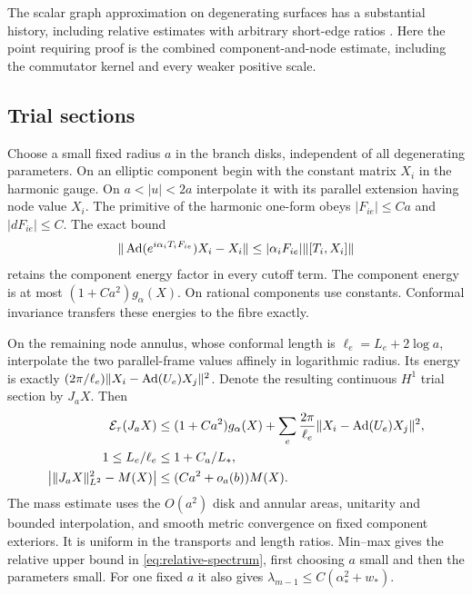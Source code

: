 The scalar graph approximation on degenerating surfaces has a
substantial history, including relative estimates with arbitrary
short-edge ratios \cite{burger}. Here the point requiring proof
is the combined component-and-node estimate, including the
commutator kernel and every weaker positive scale.

\subsection{Trial sections}
Choose a small fixed radius $a$ in the branch disks, independent
of all degenerating parameters. On an elliptic component begin
with the constant matrix $X_i$ in the harmonic gauge. On
$a<|u|<2a$ interpolate it with its parallel extension having
node value $X_i$. The primitive of the harmonic one-form obeys
$|F_{ie}|\le Ca$ and $|dF_{ie}|\le C$. The exact bound
\[
 \|\operatorname{Ad}(e^{i\alpha_iT_iF_{ie}})X_i-X_i\|
           \le|\alpha_iF_{ie}|\|[T_i,X_i]\|
\]
retains the component energy factor in every cutoff term.
The component energy is at most $(1+Ca^2)g_\alpha(X)$.
On rational components use constants. Conformal invariance
transfers these energies to the fibre exactly.

On the remaining node annulus, whose conformal length is
$\ell_e=L_e+2\log a$, interpolate the two parallel-frame
values affinely in logarithmic radius. Its energy is exactly
$(2\pi/\ell_e)\|X_i-\operatorname{Ad}(U_e)X_j\|^2$. Denote the resulting
continuous $H^1$ trial section by $J_aX$. Then
\begin{equation}\label{eq:trial-estimates}
 \begin{split}
 \mathcal E_\tau(J_aX)&\le(1+Ca^2)g_\alpha(X)
       +\sum_e\frac{2\pi}{\ell_e}
                      \|X_i-\operatorname{Ad}(U_e)X_j\|^2,\\
 1\le L_e/\ell_e&\le1+C_a/L_*,\\
 \bigl|\|J_aX\|_{L^2}^2-M(X)\bigr|
       &\le(Ca^2+o_a(b))M(X).
 \end{split}
\end{equation}
The mass estimate uses the $O(a^2)$ disk and annular areas,
unitarity and bounded interpolation, and smooth metric
convergence on fixed component exteriors. It is uniform in
the transports and length ratios. Min--max gives the relative
upper bound in \eqref{eq:relative-spectrum}, first choosing
$a$ small and then the parameters small. For one fixed $a$
it also gives $\lambda_{m-1}\le C(\alpha_*^2+w_*)$.

